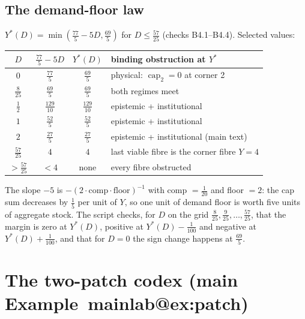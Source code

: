 \documentclass[11pt,a4paper]{article}
\makeatletter
\theoremstyle{plain}
\theoremstyle{definition}
\theoremstyle{remark}
\newcommand{\tfr}[2]{\tfrac{#1}{#2}}
\newcommand{\mref}[1]{\csname mainlab@#1\endcsname}
\makeatother
\begin{document}
\subsection{The demand-floor law}
$Y^\ast(D)=\min(\tfr{77}5-5D,\tfr{69}5)$ for $D\le\tfr{57}{25}$ (checks B4.1--B4.4). Selected values:
\begin{center}\footnotesize
\begin{tabular}{cccl}
\toprule
$D$ & $\tfr{77}5-5D$ & $Y^\ast(D)$ & binding obstruction at $Y^\ast$\\
\midrule
$0$ & $\tfrac{77}{5}$ & $\tfrac{69}{5}$ & physical: $\operatorname{cap}_2=0$ at corner 2\\
$\tfrac{8}{25}$ & $\tfrac{69}{5}$ & $\tfrac{69}{5}$ & both regimes meet\\
$\tfrac{1}{2}$ & $\tfrac{129}{10}$ & $\tfrac{129}{10}$ & epistemic + institutional\\
$1$ & $\tfrac{52}{5}$ & $\tfrac{52}{5}$ & epistemic + institutional\\
$2$ & $\tfrac{27}{5}$ & $\tfrac{27}{5}$ & epistemic + institutional (main text)\\
$\tfrac{57}{25}$ & $4$ & $4$ & last viable fibre is the corner fibre $Y=4$\\
$>\tfrac{57}{25}$ & $<4$ & none & every fibre obstructed\\
\bottomrule
\end{tabular}
\end{center}
The slope $-5$ is $-(2\cdot\text{comp}\cdot\text{floor})^{-1}$ with comp $=\tfr1{20}$ and floor $=2$: the cap sum decreases by $\tfr15$ per unit of $Y$, so one unit of demand floor is worth five units of aggregate stock. The script checks, for $D$ on the grid $\tfr8{25},\tfr9{25},\dots,\tfr{57}{25}$, that the margin is zero at $Y^\ast(D)$, positive at $Y^\ast(D)-\tfr1{100}$ and negative at $Y^\ast(D)+\tfr1{100}$, and that for $D=0$ the sign change happens at $\tfr{69}5$.
\section{The two-patch codex (main Example~\mref{ex:patch})}\label{si:patch}
\end{document}
